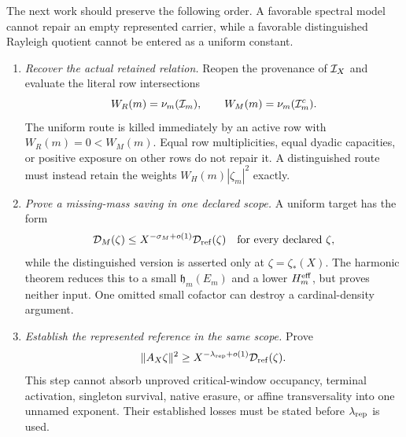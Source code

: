 The next work should preserve the following order.  A favorable spectral
model cannot repair an empty represented carrier, while a favorable
distinguished Rayleigh quotient cannot be entered as a uniform constant.

\begin{enumerate}[label=\textbf{Door \Alph*.},leftmargin=3.8em]
 \item \emph{Recover the actual retained relation.}
       Reopen the provenance of \(\mathcal I_X\) and evaluate the literal row
       intersections
       \begin{equation}
        W_R(m)=\nu_m(\mathcal I_m),
        \qquad
        W_M(m)=\nu_m(\mathcal I_m^c).
        \label{eq:tpc61-next-literal-row-census}
       \end{equation}
       The uniform route is killed immediately by an active row with
       \(W_R(m)=0<W_M(m)\).  Equal row multiplicities, equal dyadic
       capacities, or positive exposure on other rows do not repair it.
       A distinguished route must instead retain the weights
       \(W_H(m)|\zeta_m|^2\) exactly.

 \item \emph{Prove a missing-mass saving in one declared scope.}
       A uniform target has the form
       \begin{equation}
        \mathcal D_M(\zeta)
        \le X^{-\sigma_M+o(1)}\mathcal D_{\rm ref}(\zeta)
        \quad\text{for every declared }\zeta,
        \label{eq:tpc61-next-uniform-missing-saving}
       \end{equation}
       while the distinguished version is asserted only at
       \(\zeta=\zeta_*(X)\).  The harmonic theorem reduces this to a small
       \(\mathfrak h_m(E_m)\) and a lower \(H_m^{\rm eff}\), but proves
       neither input.  One omitted small cofactor can destroy a
       cardinal-density argument.

 \item \emph{Establish the represented reference in the same scope.}
       Prove
       \begin{equation}
        \|A_X\zeta\|^2
        \ge X^{-\lambda_{\rm rep}+o(1)}
             \mathcal D_{\rm ref}(\zeta).
        \label{eq:tpc61-next-represented-reference}
       \end{equation}
       This step cannot absorb unproved critical-window occupancy,
       terminal activation, singleton survival, native erasure, or affine
       transversality into one unnamed exponent.  Their established losses
       must be stated before \(\lambda_{\rm rep}\) is used.


\end{enumerate}
